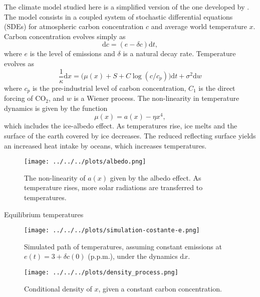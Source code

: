 \documentclass[../../main.tex]{subfiles}
\begin{document}
The climate model studied here is a simplified version of the one developed by . The model consists in a coupled system of stochastic differential equations (SDEs) for atmospheric carbon concentration $c$ and average world temperature $x$. Carbon concentration evolves simply as \begin{equation} \label{eq:climate-model-c}
    \text{d}c = (e - \delta c) \text{d} t,
\end{equation} where $e$ is the level of emissions and $\delta$ is a natural decay rate. Temperature evolves as \begin{equation} \label{eq:climate-model-x}
    \frac{1}{\kappa} \text{d}x = \Big( \mu(x) + S + C \log(c / c_p) \Big) \text{d} t + \sigma^2 \text{d}w
\end{equation} where $c_p$ is the pre-industrial level of carbon concentration, $C_1$ is the direct forcing of CO$_2$, and $w$ is a Wiener process. The non-linearity in temperature dynamics is given by the function \begin{equation}
    \mu(x) = a(x) - \eta x^4,
\end{equation} which includes the ice-albedo effect. As temperatures rise, ice melts and the surface of the earth covered by ice decreases. The reduced reflecting surface yields an increased heat intake by oceans, which increases temperatures.

\begin{figure}[H]
    \centering
    \texttt{[image: ../../../plots/albedo.png]}
    \caption{The non-linearity of $a(x)$ given by the albedo effect. As temperature rises, more solar radiations are transferred to temperatures.}
\end{figure}

Equilibrium temperatures

\begin{figure}[H]
    \centering
    \texttt{[image: ../../../plots/simulation-costante-e.png]}
    \caption{Simulated path of temperatures, assuming constant emissions at $e(t) = 3 + \delta c(0)$ (p.p.m.), under the dynamics $\text{d}x$.}
    \label{fig:x-sim}
\end{figure}


\begin{figure}[H]
    \centering
    \texttt{[image: ../../../plots/density\_process.png]}
    \caption{Conditional density of $x$, given a constant carbon concentration.}
    \label{fig:x-dens}
\end{figure}
\end{document}
